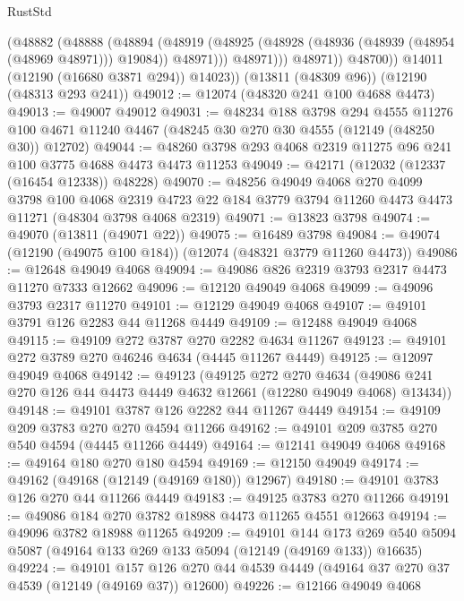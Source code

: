 \begin{lexlean}{RustStd}
\begin{coremodule}
                  (@48882
                    (@48888
                      (@48894
                        (@48919
                          (@48925
                            (@48928 (@48936 (@48939 (@48954 (@48969 @48971))) @19084))
                            @48971)))
                      @48971)))
                @48971))
            @48700))
        @14011
        (@12190 (@16680 @3871 @294))
        @14023))
    (@13811 (@48309 @96))
    (@12190 (@48313 @293 @241))
@49012 := @12074 (@48320 @241 @100 @4688 @4473)
@49013 := @49007 @49012
@49031 := @48234
    @188
    @3798
    @294
    @4555
    @11276
    @100
    @4671
    @11240
    @4467
    (@48245 @30 @270 @30 @4555 (@12149 (@48250 @30)) @12702)
@49044 := @48260 @3798 @293 @4068 @2319 @11275 @96 @241 @100 @3775 @4688 @4473 @4473 @11253
@49049 := @42171 (@12032 (@12337 (@16454 @12338)) @48228)
@49070 := @48256
    @49049
    @4068
    @270
    @4099
    @3798
    @100
    @4068
    @2319
    @4723
    @22
    @184
    @3779
    @3794
    @11260
    @4473
    @4473
    @11271
    (@48304 @3798 @4068 @2319)
@49071 := @13823 @3798
@49074 := @49070 (@13811 (@49071 @22))
@49075 := @16489 @3798
@49084 := @49074 (@12190 (@49075 @100 @184)) (@12074 (@48321 @3779 @11260 @4473))
@49086 := @12648 @49049 @4068
@49094 := @49086 @826 @2319 @3793 @2317 @4473 @11270 @7333 @12662
@49096 := @12120 @49049 @4068
@49099 := @49096 @3793 @2317 @11270
@49101 := @12129 @49049 @4068
@49107 := @49101 @3791 @126 @2283 @44 @11268 @4449
@49109 := @12488 @49049 @4068
@49115 := @49109 @272 @3787 @270 @2282 @4634 @11267
@49123 := @49101 @272 @3789 @270 @46246 @4634 (@4445 @11267 @4449)
@49125 := @12097 @49049 @4068
@49142 := @49123
    (@49125
      @272
      @270
      @4634
      (@49086 @241 @270 @126 @44 @4473 @4449 @4632 @12661 (@12280 @49049 @4068) @13434))
@49148 := @49101 @3787 @126 @2282 @44 @11267 @4449
@49154 := @49109 @209 @3783 @270 @270 @4594 @11266
@49162 := @49101 @209 @3785 @270 @540 @4594 (@4445 @11266 @4449)
@49164 := @12141 @49049 @4068
@49168 := @49164 @180 @270 @180 @4594
@49169 := @12150 @49049
@49174 := @49162 (@49168 (@12149 (@49169 @180)) @12967)
@49180 := @49101 @3783 @126 @270 @44 @11266 @4449
@49183 := @49125 @3783 @270 @11266
@49191 := @49086 @184 @270 @3782 @18988 @4473 @11265 @4551 @12663
@49194 := @49096 @3782 @18988 @11265
@49209 := @49101
    @144
    @173
    @269
    @540
    @5094
    @5087
    (@49164 @133 @269 @133 @5094 (@12149 (@49169 @133)) @16635)
@49224 := @49101
    @157
    @126
    @270
    @44
    @4539
    @4449
    (@49164 @37 @270 @37 @4539 (@12149 (@49169 @37)) @12600)
@49226 := @12166 @49049 @4068

\end{coremodule}
\end{lexlean}
